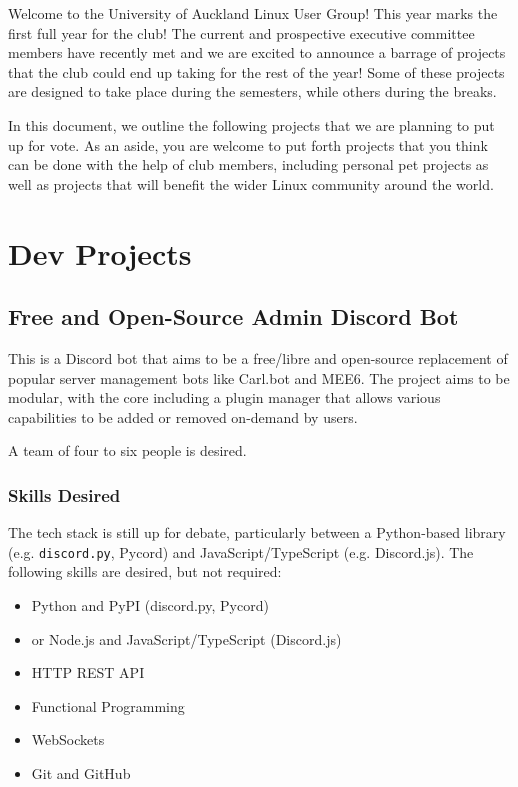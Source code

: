 \documentclass[11pt,fleqn]{article}
\begin{document}
\newpage

Welcome to the University of Auckland Linux User Group!  This year marks the first full year for the club!  The current and prospective executive committee members have recently met and we are excited to announce a barrage of projects that the club could end up taking for the rest of the year!  Some of these projects are designed to take place during the semesters, while others during the breaks.

In this document, we outline the following projects that we are planning to put up for vote.  As an aside, you are welcome to put forth projects that you think can be done with the help of club members, including personal pet projects as well as projects that will benefit the wider Linux community around the world.

\tableofcontents

\newpage

\section{Dev Projects}

\subsection{Free and Open-Source Admin Discord Bot}

This is a Discord bot that aims to be a free/libre and open-source replacement of popular server management bots like Carl.bot and MEE6.  The project aims to be modular, with the core including a plugin manager that allows various capabilities to be added or removed on-demand by users.

A team of four to six people is desired.

\subsubsection*{Skills Desired}

The tech stack is still up for debate, particularly between a Python-based library (e.g. \texttt{discord.py}, Pycord) and JavaScript/TypeScript (e.g. Discord.js).  The following skills are desired, but not required:

\begin{multicols}{2}
\begin{itemize}
    \item Python and PyPI (discord.py, Pycord)
    \item or Node.js and JavaScript/TypeScript (Discord.js)
    \item HTTP REST API
    \item Functional Programming
    \item WebSockets
    \item Git and GitHub
\end{itemize}
\end{multicols}
\end{document}
